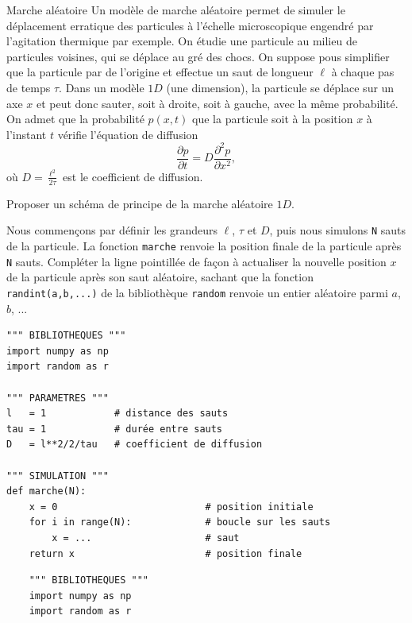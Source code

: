 \begin{exo}[PC][1][python]{Marche aléatoire}
Un modèle de marche aléatoire permet de simuler le déplacement erratique des particules à l'échelle microscopique engendré par l'agitation thermique par exemple. On étudie une particule au milieu de particules voisines, qui se déplace au gré des chocs. On suppose pous simplifier que la particule par de l'origine et effectue un saut de longueur $\ell$ à chaque pas de temps $\tau$. Dans un modèle $1D$ (une dimension), la particule se déplace sur un axe $x$ et peut donc sauter, soit à droite, soit à gauche, avec la même probabilité. On admet que la probabilité $p(x,t)$ que la particule soit à la position $x$ à l'instant $t$ vérifie l'équation de diffusion
\begin{equation}
  \frac{\partial p}{\partial t} = D \frac{\partial^2 p}{\partial x^2},
\end{equation}
où $D=\textstyle\frac{\ell^2}{2\tau}$ est le coefficient de diffusion.

\begin{quest}
  \item Proposer un schéma de principe de la marche aléatoire $1D$.
  \item	Nous commençons par définir les grandeurs $\ell$, $\tau$ et $D$, puis nous simulons \texttt{N} sauts de la particule. La fonction \texttt{marche} renvoie la position finale de la particule après \texttt{N} sauts. Compléter la ligne pointillée de façon à actualiser la nouvelle position $x$ de la particule après son saut aléatoire, sachant que la fonction \texttt{randint(a,b,...)} de la bibliothèque \texttt{random} renvoie un entier aléatoire parmi $a$, $b$, ...
  \begin{verbatim}
""" BIBLIOTHEQUES """
import numpy as np
import random as r

""" PARAMETRES """
l   = 1            # distance des sauts
tau = 1            # durée entre sauts
D   = l**2/2/tau   # coefficient de diffusion

""" SIMULATION """
def marche(N):
    x = 0                          # position initiale
    for i in range(N):             # boucle sur les sauts
        x = ...                    # saut
    return x                       # position finale
\end{verbatim}

  \begin{verbatim}
    """ BIBLIOTHEQUES """
    import numpy as np
    import random as r
    

\end{verbatim}
\end{quest}
\end{exo}
